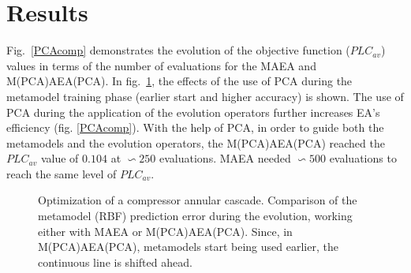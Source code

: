 \section{Results}

Fig.\ \ref{PCAcomp} demonstrates the evolution of the objective function ($PLC_{av}$) values in terms of the number of evaluations for the MAEA and M(PCA)AEA(PCA). In fig.\ \ref{PCAcomp2}, the effects of the use of PCA during the metamodel training phase (earlier start and higher accuracy) is shown. The use of PCA during the application of the evolution operators further increases EA's efficiency (fig. \ref{PCAcomp}). With the help of PCA, in order to guide both the metamodels and the evolution operators, the  M(PCA)AEA(PCA) reached the $PLC_{av}$ value of $0.104$ at $\backsim 250$ evaluations. MAEA needed $\backsim 500$ evaluations to reach the same level of $PLC_{av}$.      


\begin{figure}[h!]
\begin{minipage}[b]{1\linewidth}
 \centering
\end{minipage}
\caption{Optimization of a compressor annular cascade. Comparison of the metamodel (RBF) prediction error during the evolution, working either with MAEA or M(PCA)AEA(PCA). Since, in M(PCA)AEA(PCA), metamodels start being used earlier, the continuous line is shifted ahead.} 
\label{PCAcomp2}
\end{figure}

